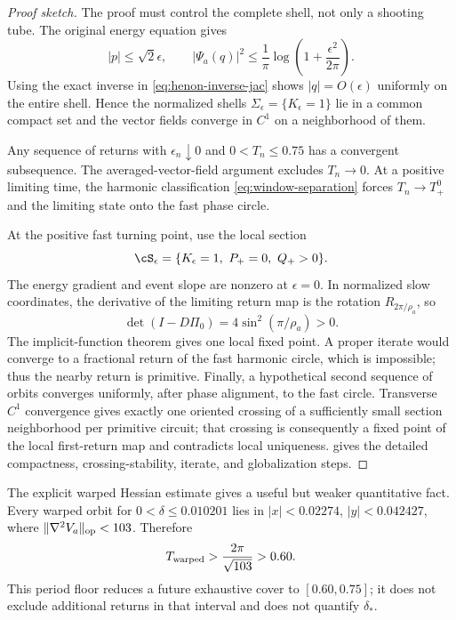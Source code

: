 \begin{proof}[Proof sketch]
The proof must control the complete shell, not only a shooting tube.  The
original energy equation gives
\[
 |p|\le\sqrt2\epsilon,\qquad
 |\Psi_a(q)|^2\le\frac1\pi
 \log\left(1+\frac{\epsilon^2}{2\pi}\right).
\]
Using the exact inverse in \cref{eq:henon-inverse-jac} shows
\(|q|=O(\epsilon)\) uniformly on the entire shell.  Hence the normalized
shells \(\Sigma_\epsilon=\{K_\epsilon=1\}\) lie in a common compact set and
the vector fields converge in \(C^1\) on a neighborhood of them.

Any sequence of returns with \(\epsilon_n\downarrow0\) and
\(0<T_n\le0.75\) has a convergent subsequence.  The averaged-vector-field
argument excludes \(T_n\to0\).  At a positive limiting time, the harmonic
classification \cref{eq:window-separation} forces
\(T_n\to T_+^0\) and the limiting state onto the fast phase circle.

At the positive fast turning point, use the local section
\[
 \cS_\epsilon=\{K_\epsilon=1,\ P_+=0,\ Q_+>0\}.
\]
The energy gradient and event slope are nonzero at \(\epsilon=0\).  In
normalized slow coordinates, the derivative of the limiting return map is
the rotation \(R_{2\pi/\rho_a}\), so
\[
 \det(I-D\Pi_0)=4\sin^2(\pi/\rho_a)>0.
\]
The implicit-function theorem gives one local fixed point.  A proper iterate
would converge to a fractional return of the fast harmonic circle, which is
impossible; thus the nearby return is primitive.  Finally, a hypothetical
second sequence of orbits converges uniformly, after phase alignment, to the
fast circle.  Transverse \(C^1\) convergence gives exactly one oriented
crossing of a sufficiently small section neighborhood per primitive circuit;
that crossing is consequently a fixed point of the local first-return map
and contradicts local uniqueness.   gives the detailed
compactness, crossing-stability, iterate, and globalization steps.
\end{proof}

The explicit warped Hessian estimate gives a useful but weaker quantitative
fact.  Every warped orbit for \(0<\delta\le0.010201\) lies in
\(|x|<0.02274\), \(|y|<0.042427\), where
\(\|\nabla^2V_a\|_{\rm op}<103\).  Therefore
\begin{equation}
 T_{\rm warped}>\frac{2\pi}{\sqrt{103}}>0.60.
 \label{eq:warped-period-floor}
\end{equation}
This period floor reduces a future exhaustive cover to
\([0.60,0.75]\); it does not exclude additional returns in that interval and
does not quantify \(\delta_*\).

